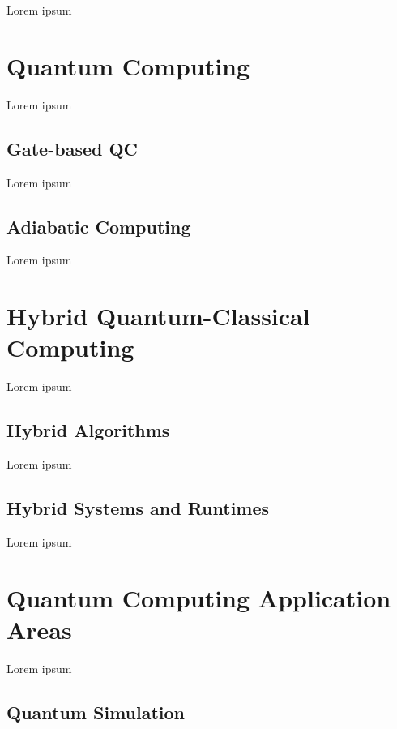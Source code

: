 \label{chapter:background}

Lorem ipsum

\section{Quantum Computing}
\label{sect:background--quantum-computing}

Lorem ipsum

\subsection{Gate-based QC}
\label{subsect:background--gate-based-quantum-computing}

Lorem ipsum

\subsection{Adiabatic Computing}
\label{subsect:background--adiabatic-computing}

Lorem ipsum

\section{Hybrid Quantum-Classical Computing}
\label{sect:background--hybrid-quantum-classical-computing}

Lorem ipsum


\subsection{Hybrid Algorithms}
\label{subsect:background--hybrid-algorithms}

Lorem ipsum

\subsection{Hybrid Systems and Runtimes}
\label{subsect:background--hybrid-systems-and-runtimes}

Lorem ipsum

\section{Quantum Computing Application Areas}
\label{sect:background--quantum-computing-applications}

Lorem ipsum

\subsection{Quantum Simulation}
\label{subsect:background--quantum-simulation}

